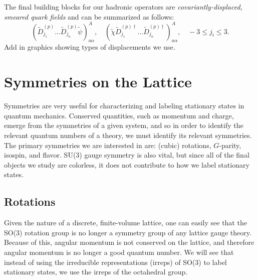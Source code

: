     The final building blocks for our hadronic operators are \emph{covariantly-displaced, smeared quark fields} and can be summarized as follows:
    \begin{equation}
        \boxed{\left(\widetilde{D}_{j_{1}}^{(p)} \ldots \widetilde{D}_{j_{n}}^{(p)} \widetilde{\psi}\right)_{a \alpha}^{A}, \quad\left(\widetilde{\chi} \widetilde{D}_{j_{1}}^{(p) \dagger} \ldots \widetilde{D}_{j_{n}}^{(p) \dagger}\right)_{a \alpha}^{A}, \quad-3 \leq j_{i} \leq 3.}
    \end{equation}
    {\color{red}Add in graphics showing types of displacements we use.}

    \section{Symmetries on the Lattice}
    Symmetries are very useful for characterizing and labeling stationary states in quantum mechanics. Conserved quantities, such as momentum and charge, emerge from the symmetries of a given system, and so in order to identify the relevant quantum numbers of a theory, we must identify its relevant symmetries. The primary symmetries we are interested in are: (cubic) rotations, $G$-parity, isospin, and flavor. SU(3) gauge symmetry is also vital, but since all of the final objects we study are colorless, it does not contribute to how we label stationary states.
    
    \subsection{Rotations}
    Given the nature of a discrete, finite-volume lattice, one can easily see that the SO(3) rotation group is no longer a symmetry group of any lattice gauge theory. Because of this, angular momentum is not conserved on the lattice, and therefore angular momentum is no longer a good quantum number. We will see that instead of using the irreducible representations (irreps) of SO(3) to label stationary states, we use the irreps of the octahedral group.

